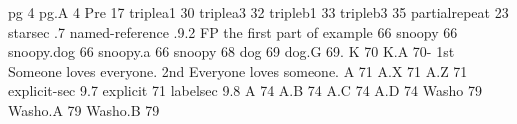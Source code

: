 \relax 
\@fd@f pg {{4}}
\@fd@f pg.A {{{}}{{4}}}
\@fd@f Pre {{17}}
\@fd@f triplea1 {{30}}
\@fd@f triplea3 {{32}}
\@fd@f tripleb1 {{33}}
\@fd@f tripleb3 {{35}}
\@fd@f partialrepeat {{23}}
\@fd@f starsec {{.7}}
\@fd@f named-reference {{.9.2}}
\@fd@f FP {{the first part of example 66}}
\@fd@f snoopy {{66}}
\@fd@f snoopy.dog {{{}}{{66}}}
\@fd@f snoopy.a {{{}}{{66}}}
\@fd@f snoopy {{68{\it {}}}}
\@fd@f dog {{69}}
\@fd@f dog.G {{{\number \pexcnt }}{{69.\number \pexcnt }}}
\@fd@f K {{70}}
\@fd@f K.A {{{\number \pexcnt }}{{70-\number \pexcnt }}}
\@fd@f 1st {{Someone loves everyone.}}
\@fd@f 2nd {{Everyone loves someone.}}
\@fd@f A {{71}}
\@fd@f A.X {{{}}{{71}}}
\@fd@f A.Z {{{}}{{71}}}
\@fd@f explicit-sec {{9.7}}
\@fd@f explicit {{{71}\relax }}
\@fd@f labelsec {{9.8}}
\@fd@f A {{74}}
\@fd@f A.B {{{}}{{74}}}
\@fd@f A.C {{{}}{{74}}}
\@fd@f A.D {{{}}{{74}}}
\@fd@f Washo {{79}}
\@fd@f Washo.A {{{}}{{79}}}
\@fd@f Washo.B {{{}}{{79}}}
